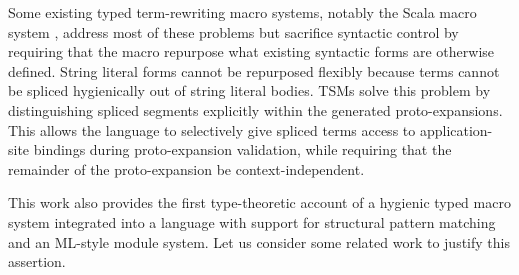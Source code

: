 Some existing typed term-rewriting macro systems, notably the Scala macro system \cite{ScalaMacros2013}, address most of these problems but sacrifice syntactic control by requiring that the macro repurpose what existing syntactic forms are otherwise defined. String literal forms cannot be repurposed flexibly because terms cannot be spliced hygienically out of string literal bodies. TSMs solve this problem by  distinguishing spliced segments explicitly within the generated proto-expansions. This allows the language to selectively give spliced terms access to application-site bindings during proto-expansion validation, while requiring that the remainder of the proto-expansion be context-independent.

This work also provides the first  type-theoretic account of a hygienic typed macro system integrated into a language with support for structural pattern matching and an ML-style module system. Let us consider some related work to justify this assertion.
